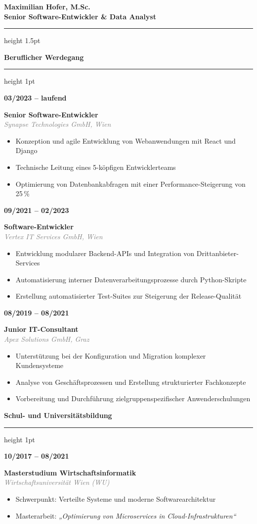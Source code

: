 \documentclass[10pt,a4paper]{article}
\newcommand{\cvsection}[1]{%
  \vspace{0.25cm}%
  {\large\bfseries\color{primary}#1}%
  \vspace{0.1cm}%
  \hrule height 1pt%
  \vspace{0.15cm}%
}
\newcommand{\cventry}[4]{%
  \noindent
  \begin{minipage}[t]{2.3cm}
    \raggedright\small\textbf{#1}
  \end{minipage}%
  \begin{minipage}[t]{\dimexpr\linewidth-2.3cm\relax}
    \raggedright
    \textbf{#2} \\
    \textcolor{graytext}{\small\textit{#3}} \\[0.05cm]
    {\small #4}
  \end{minipage}\par\vspace{0.22cm}
}
\begin{document}
\hfill
\begin{minipage}[t]{0.65\textwidth}
  {\Huge\bfseries\color{primary} Maximilian Hofer, M.Sc.} \\[0.1cm]
  {\large\bfseries\color{graytext} Senior Software-Entwickler \& Data Analyst}
  
  \vspace{0.2cm}
  \hrule height 1.5pt
  \vspace{0.3cm}
  
  \cvsection{Beruflicher Werdegang}
  
  \cventry{03/2023 -- laufend}{Senior Software-Entwickler}{Synapse Technologies GmbH, Wien}{
    \begin{itemize}
      \item Konzeption und agile Entwicklung von Webanwendungen mit React und Django
      \item Technische Leitung eines 5-köpfigen Entwicklerteams
      \item Optimierung von Datenbankabfragen mit einer Performance-Steigerung von 25\,\%
    \end{itemize}
  }
  
  \cventry{09/2021 -- 02/2023}{Software-Entwickler}{Vertex IT Services GmbH, Wien}{
    \begin{itemize}
      \item Entwicklung modularer Backend-APIs und Integration von Drittanbieter-Services
      \item Automatisierung interner Datenverarbeitungsprozesse durch Python-Skripte
      \item Erstellung automatisierter Test-Suites zur Steigerung der Release-Qualität
    \end{itemize}
  }
  
  \cventry{08/2019 -- 08/2021}{Junior IT-Consultant}{Apex Solutions GmbH, Graz}{
    \begin{itemize}
      \item Unterstützung bei der Konfiguration und Migration komplexer Kundensysteme
      \item Analyse von Geschäftsprozessen und Erstellung strukturierter Fachkonzepte
      \item Vorbereitung und Durchführung zielgruppenspezifischer Anwenderschulungen
    \end{itemize}
  }
  
  \cvsection{Schul- und Universitätsbildung}
  
  \cventry{10/2017 -- 08/2021}{Masterstudium Wirtschaftsinformatik}{Wirtschaftsuniversität Wien (WU)}{
    \begin{itemize}
      \item Schwerpunkt: Verteilte Systeme und moderne Softwarearchitektur
      \item Masterarbeit: \textit{„Optimierung von Microservices in Cloud-Infrastrukturen“}
    \end{itemize}
  }
  

\end{minipage}
\end{document}
